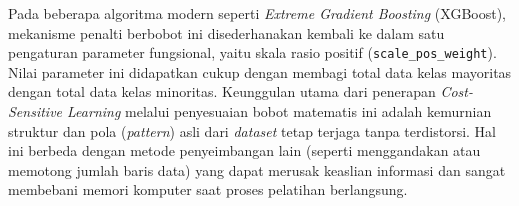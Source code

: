Pada beberapa algoritma modern seperti \textit{Extreme Gradient Boosting} (XGBoost), mekanisme penalti berbobot ini disederhanakan kembali ke dalam satu pengaturan parameter fungsional, yaitu skala rasio positif (\texttt{scale\_pos\_weight}). Nilai parameter ini didapatkan cukup dengan membagi total data kelas mayoritas dengan total data kelas minoritas. Keunggulan utama dari penerapan \textit{Cost-Sensitive Learning} melalui penyesuaian bobot matematis ini adalah kemurnian struktur dan pola (\textit{pattern}) asli dari \textit{dataset} tetap terjaga tanpa terdistorsi. Hal ini berbeda dengan metode penyeimbangan lain (seperti menggandakan atau memotong jumlah baris data) yang dapat merusak keaslian informasi dan sangat membebani memori komputer saat proses pelatihan berlangsung.
